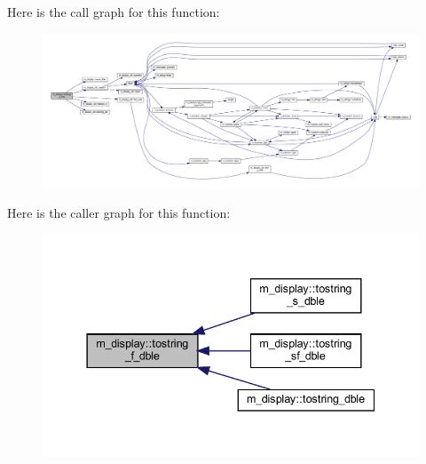 Here is the call graph for this function\+:
\nopagebreak
\begin{figure}[H]
\begin{center}
\leavevmode
\includegraphics[width=350pt]{namespacem__display_af82ac5edf2d812767205ea93974885d6_cgraph}
\end{center}
\end{figure}
Here is the caller graph for this function\+:
\nopagebreak
\begin{figure}[H]
\begin{center}
\leavevmode
\includegraphics[width=337pt]{namespacem__display_af82ac5edf2d812767205ea93974885d6_icgraph}
\end{center}
\end{figure}
\mbox{\label{namespacem__display_ac1dd519655fda1c495ba40efe16fbc0b}} 
